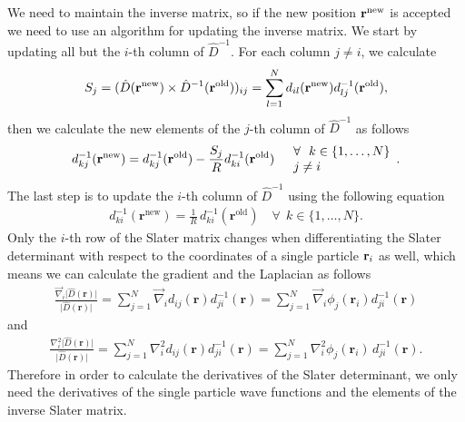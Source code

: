 \documentclass[../main.tex]{subfiles}
\begin{document}
\begin{appendices}
We need to maintain the inverse matrix, so if the new position ${\bf r}^{\textrm{new}}$ is accepted we need to use an algorithm for updating the inverse matrix. We start by updating all but the $i$-th column of $\hat{D}^{-1}$. For each column $j\neq i$, we calculate 
\begin{align}
    S_j = (\hat{D}({\bf r}^{\textrm{new}})\times \hat{D}^{-1}({\bf r}^{\textrm{old}}))_{ij} = \sum_{l=1}^N d_{il}({\bf r}^{\textrm{new}}) d_{lj}^{-1}({\bf r}^{\textrm{old}}), 
\end{align}
then we calculate the new elements of the $j$-th column of $\hat{D}^{-1}$ as follows
\begin{align}
    d_{kj}^{-1}({\bf r}^{\textrm{new}}) = d_{kj}^{-1}({\bf r}^{\textrm{old}}) - \frac{S_j}{R} d_{ki}^{-1}({\bf r}^{\textrm{old}}) \quad 
    \begin{array}{ll}
    \forall\ \ k\in\{1,\dots,N\}\\j\neq i
    \end{array}.
\end{align}
The last step is to update the $i$-th column of $\hat{D}^{-1}$ using the following equation
\begin{align}
    d_{ki}^{-1}(\mathbf{r}^{\mathrm{new}}) =
\frac{1}{R}\,d_{ki}^{-1}(\mathbf{r}^{\mathrm{old}})\quad
\forall\ \ k\in\{1,\dots,N\}.
\end{align}
Only the $i$-th row of the Slater matrix changes when differentiating the Slater determinant with respect to the coordinates of a single particle ${\bf r}_i$ as well, which means we can calculate the gradient and the Laplacian as follows 
\begin{align}\label{eq: gradSlater}
    \frac{\vec\nabla_i\vert\hat{D}(\mathbf{r})\vert}{\vert\hat{D}(\mathbf{r})\vert} =
    \sum_{j=1}^N \vec\nabla_i d_{ij}(\mathbf{r})d_{ji}^{-1}(\mathbf{r}) =
    \sum_{j=1}^N \vec\nabla_i \phi_j(\mathbf{r}_i)d_{ji}^{-1}(\mathbf{r})
\end{align}
and
\begin{align}\label{eq: lapSlater}
    \frac{\nabla^2_i\vert\hat{D}(\mathbf{r})\vert}{\vert\hat{D}(\mathbf{r})\vert} =
    \sum_{j=1}^N \nabla^2_i d_{ij}(\mathbf{r})d_{ji}^{-1}(\mathbf{r}) =
    \sum_{j=1}^N \nabla^2_i \phi_j(\mathbf{r}_i)\,d_{ji}^{-1}(\mathbf{r}).
\end{align}
Therefore in order to calculate the derivatives of the Slater determinant, we only need the derivatives of the single particle wave functions and the elements of the inverse Slater matrix.


\end{appendices}
\end{document}
